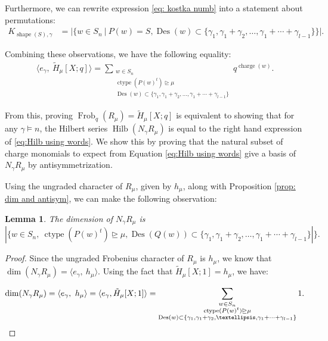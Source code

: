 \documentclass[10pt]{amsart}
\theoremstyle{plain}
\theoremstyle{definition}
\theoremstyle{plain}
\newtheorem{lemma}[lemma]{Lemma}
\theoremstyle{plain}
\theoremstyle{remark}
\theoremstyle{plain}
\theoremstyle{plain}
\DeclareMathOperator{\charge}{charge}
\DeclareMathOperator{\ctype}{ctype}
\DeclareMathOperator{\Frob}{Frob}
\DeclareMathOperator{\Hilb}{Hilb}
\DeclareMathOperator{\shape}{shape}
\DeclareMathOperator{\des}{Des}
\newcommand{\mHL}{\tilde{H}}
\begin{document}
Furthermore, we can rewrite expression \eqref{eq: kostka numb} into a statement about permutations:
\begin{align*}
    K_{\shape(S),\gamma} &=  | \{w \in S_n  \ | \ P(w) = S, \des(w) \subset \{\gamma_1,\gamma_1 + \gamma_2, \dots, \gamma_1 +\cdots + \gamma_{l-1}\} \} |.
\end{align*}



Combining these observations, we have the following equality:
\begin{align}\label{eq:Hilb using words}
    \langle e_{\gamma},\  \mHL_{\mu} [X;q]\rangle  = \sum\limits_{\substack{w\in S_n\\  \ctype(P(w)^t)\unrhd\mu \\ \des(w) \subset \{\gamma_1,\gamma_1 + \gamma_2, \dots, \gamma_1 +\cdots + \gamma_{l-1}\} }}  q^{\charge(w)}.
\end{align}

From this, proving $\Frob_q(R_{\mu}) = \mHL_{\mu}[X;q]$ is equivalent to showing that for any $\gamma\models n$, the Hilbert series $\Hilb(N_\gamma R_{\mu})$ is equal to the right hand expression of \eqref{eq:Hilb using words}.
We show this by proving that the natural subset of charge monomials to expect from Equation \eqref{eq:Hilb using words} give a basis of $N_\gamma R_{\mu}$ by antisymmetrization.


Using the ungraded character of $R_\mu$, given by $h_\mu$, along with Proposition \ref{prop: dim and antisym}, we can make the following observation:
\begin{lemma}\label{lem:antisymm dimension}
    The dimension of $N_\gamma R_{\mu}$ is 
    \[|\{ w \in S_n, \ \ctype(P(w)^t) \unrhd\mu, \des(Q(w)) \subset \{\gamma_1,\gamma_1 + \gamma_2, \dots, \gamma_1 + \cdots + \gamma_{l-1}\}|\}.\]
\end{lemma}
\begin{proof}
    Since the ungraded Frobenius character of $R_{\mu}$ is $h_{\mu}$, we know that $\dim(N_\gamma R_{\mu}) = \langle e_{\gamma},\ h_{\mu} \rangle$.
    Using the fact that $\mHL_{\mu}[X;1] = h_{\mu}$, we have:
    
    \[\dim(N_\gamma R_{\mu}) = \langle e_{\gamma},\ h_{\mu} \rangle =   \langle e_{\gamma},\mHL_{\mu}[X;1] \rangle = \sum\limits_{\substack{w\in S_n\\  \ctype(P(w)^t)\unrhd\mu \\ \des(w) \subset \{\gamma_1,\gamma_1 + \gamma_2, \dots, \gamma_1 +\cdots + \gamma_{l-1}\} }}  1. \qedhere\]
\end{proof}
\end{document}
